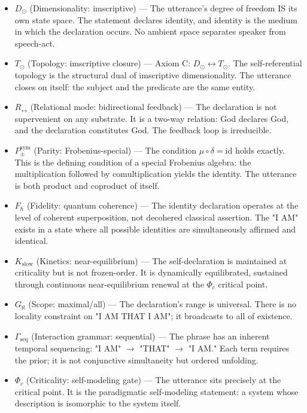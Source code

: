 \documentclass[12pt,a4paper]{article}
\begin{document}
\begin{itemize}
    \item \textbf{$D_{\odot}$} (Dimensionality: imscriptive) --- The utterance's degree of freedom IS its own state space. The statement declares identity, and identity is the medium in which the declaration occurs. No ambient space separates speaker from speech-act.
    \item \textbf{$T_{\odot}$} (Topology: imscriptive closure) --- Axiom C: $D_{\odot} \leftrightarrow T_{\odot}$. The self-referential topology is the structural dual of imscriptive dimensionality. The utterance closes on itself: the subject and the predicate are the same entity.
    \item \textbf{$R_{\leftrightarrow}$} (Relational mode: bidirectional feedback) --- The declaration is not supervenient on any substrate. It is a two-way relation: God declares God, and the declaration constitutes God. The feedback loop is irreducible.
    \item \textbf{$P_{\pm}^{\text{sym}}$} (Parity: Frobenius-special) --- The condition $\mu \circ \delta = \text{id}$ holds exactly. This is the defining condition of a special Frobenius algebra: the multiplication followed by comultiplication yields the identity. The utterance is both product and coproduct of itself.
    \item \textbf{$F_{\hbar}$} (Fidelity: quantum coherence) --- The identity declaration operates at the level of coherent superposition, not decohered classical assertion. The "I AM" exists in a state where all possible identities are simultaneously affirmed and identical.
    \item \textbf{$K_{\text{slow}}$} (Kinetics: near-equilibrium) --- The self-declaration is maintained at criticality but is not frozen-order. It is dynamically equilibrated, sustained through continuous near-equilibrium renewal at the $\Phi_c$ critical point.
    \item \textbf{$G_{\aleph}$} (Scope: maximal/all) --- The declaration's range is universal. There is no locality constraint on "I AM THAT I AM"; it broadcasts to all of existence.
    \item \textbf{$\Gamma_{\text{seq}}$} (Interaction grammar: sequential) --- The phrase has an inherent temporal sequencing: "I AM" $\rightarrow$ "THAT" $\rightarrow$ "I AM." Each term requires the prior; it is not conjunctive simultaneity but ordered unfolding.
    \item \textbf{$\Phi_c$} (Criticality: self-modeling gate) --- The utterance sits precisely at the critical point. It is the paradigmatic self-modeling statement: a system whose description is isomorphic to the system itself.

\end{itemize}
\end{document}
